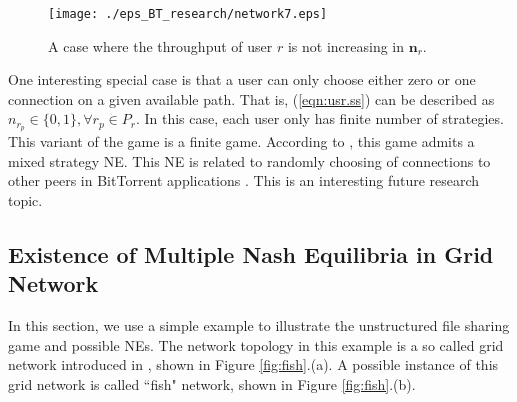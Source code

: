 \documentclass[conference]{IEEEtran}
\begin{document}
\begin{figure}[htb!]
    \begin{center}
\texttt{[image: ./eps\_BT\_research/network7.eps]}\\
        \caption{A case where the throughput of user $r$ is not increasing in $\mathbf{n}_r$.}
        \label{fig:not.in}
     \end{center}
\end{figure}

One interesting special case is that a user can only choose either
zero or one connection on a given available path. That is,
(\ref{eqn:usr.ss}) can be described as $n_{r_p}\in \{0, 1\},
\forall r_p \in P_r$. In this case, each user only has finite
number of strategies. This variant of the game is a finite game.
According to \cite{nash50}, this game admits a mixed strategy NE.
This NE is related to randomly choosing of connections to other
peers in BitTorrent applications \cite{bt}. This is an interesting
future research topic.





\subsection{Existence of Multiple Nash Equilibria in Grid Network}
\label{sec:multiple}


In this section, we use a simple example to illustrate the
unstructured file sharing game and possible NEs. The network
topology in this example is a so called grid network introduced in
\cite{bonald01impact}, shown in Figure \ref{fig:fish}.(a). A
possible instance of this grid network is called ``fish" network,
shown in Figure \ref{fig:fish}.(b).
\end{document}
